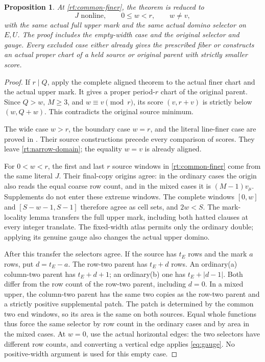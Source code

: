 \documentclass[11pt,a4paper]{amsart}
\numberwithin{equation}{section}
\theoremstyle{plain}
\newtheorem{proposition}[theorem]{Proposition}
\theoremstyle{definition}
\begin{document}
\begin{proposition}\label{rt:preprocessing}
At \eqref{rt:common-finer}, the theorem is reduced to
\begin{equation}\label{rt:narrow-domain}
 J\text{ nonline},\qquad 0\le w<r,\qquad w\ne v,
\end{equation}
with the same actual full upper mark and the same actual domino selector on \(E,U\).  The proof includes the empty-width case and the original selector and gauge.  Every excluded case either already gives the prescribed fiber or constructs an actual proper chart of a held source or original parent with strictly smaller score.
\end{proposition}
\begin{proof}
If \(r\mid Q\), apply the complete aligned theorem to the actual finer chart and the actual upper mark.  It gives a proper period-\(r\) chart of the original parent.  Since \(Q>w\), \(M\ge3\), and \(w\equiv v\pmod r\), its score \((v,r+v)\) is strictly below \((w,Q+w)\).  This contradicts the original source minimum.

The wide case \(w>r\), the boundary case \(w=r\), and the literal line-finer case are proved in .  Their source constructions precede every comparison of scores.  They leave \eqref{rt:narrow-domain}; the equality \(w=v\) is already aligned.

For \(0<w<r\), the first and last \(r\) source windows in \eqref{rt:common-finer} come from the same literal \(J\).  Their final-copy origins agree: in the ordinary cases the origin also reads the equal coarse row count, and in the mixed cases it is \((M-1)v_\mu\).  Supplements do not enter these extreme windows.  The complete windows \([0,w]\) and \([S-w-1,S-1]\) therefore agree as cell sets, and \(2w<S\).  The mark-locality lemma \cite[Locality of legal marks in the two end windows]{Shields2026Gluing} transfers the full upper mark, including both hatted clauses at every integer translate.  The fixed-width atlas permits only the ordinary double; applying its genuine gauge also changes the actual upper domino.

After this transfer the selectors agree.  If the source has \(t_E\) rows and the mark \(a\) rows, put \(d=t_E-a\).  The row-two parent has \(t_E+d\) rows.  An ordinary(a) column-two parent has \(t_E+d+1\); an ordinary(b) one has \(t_E+|d-1|\).  Both differ from the row count of the row-two parent, including \(d=0\).  In a mixed upper, the column-two parent has the same two copies as the row-two parent and a strictly positive supplemental patch.  The patch is determined by the common two end windows, so its area is the same on both sources.  Equal whole functions thus force the same selector by row count in the ordinary cases and by area in the mixed cases.  At \(w=0\), use the actual horizontal edges: the two selectors have different row counts, and converting a vertical edge applies \eqref{eq:gauge}.  No positive-width argument is used for this empty case.
\end{proof}
\end{document}
